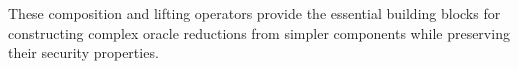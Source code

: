 \begin{definition}
    \label{def:state_function_lift_context}
\end{definition}

These composition and lifting operators provide the essential building blocks for constructing complex oracle reductions from simpler components while preserving their security properties.






